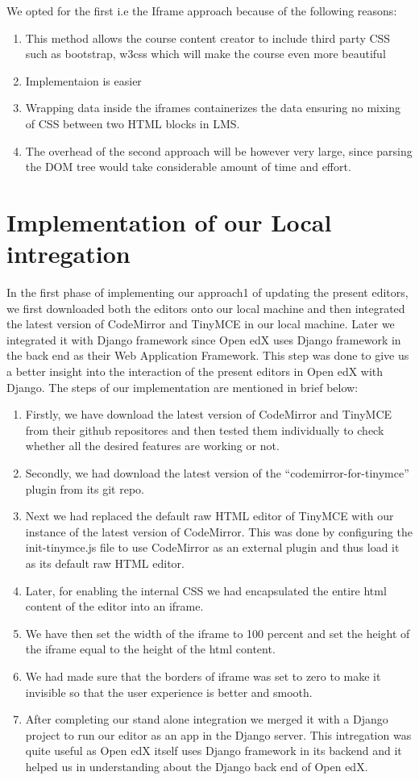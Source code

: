 We opted for the first i.e the Iframe approach because of the following reasons:
\begin{enumerate}
\item This method allows the course content creator to include third party CSS such as
bootstrap, w3css which will make the course even more beautiful
\item Implementaion is easier
\item Wrapping data inside the iframes containerizes the data ensuring no mixing of
CSS between two HTML blocks in LMS.
\item The overhead of the second approach will be however very large, since parsing
the DOM tree would take considerable amount of time and effort.
\end{enumerate}


\section{Implementation of our Local intregation}
In the first phase of implementing our approach1 of updating the present editors, we
first downloaded both the editors onto our local machine and then integrated the latest
version of CodeMirror and TinyMCE in our local machine. Later we integrated it with
Django framework since Open edX uses Django framework in the back end as their Web
Application Framework. This step was done to give us a better insight into the interaction of
the present editors in Open edX with Django. The steps of our implementation are
mentioned in brief below:
\begin{enumerate}
\item Firstly, we have download the latest version of CodeMirror and TinyMCE from their
github repositores and then tested them individually to check whether all the desired features
are working or not.
\item Secondly, we had download the latest version of the “codemirror-for-tinymce” plugin
from its git repo.
\item Next we had replaced the default raw HTML editor of TinyMCE with our instance of the
latest version of CodeMirror. This was done by configuring the init-tinymce.js file to use
CodeMirror as an external plugin and thus load it as its default raw HTML editor.
\item Later, for enabling the internal CSS we had encapsulated the entire html content of the
editor into an iframe.
\item We have then set the width of the iframe to 100 percent and set the height of the iframe
equal to the height of the html content.
\item  We had made sure that the borders of iframe was set to zero to make it invisible so that
the user experience is better and smooth.
\item After completing our stand alone integration we merged it with a Django project to run
our editor as an app in the Django server. This intregation was quite useful as Open edX
itself uses Django framework in its backend and it helped us in understanding about the
Django back end of Open edX.
\end{enumerate}


